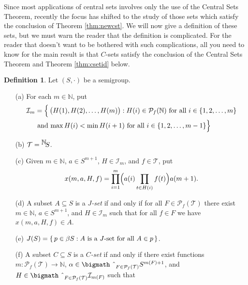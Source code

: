 \documentclass[12pt]{article}
\theoremstyle{plain}
\theoremstyle{definition}
\newtheorem{defn}[thm]{Definition}
\newcommand{\bbN}{\mathbb{N}}
\newcommand{\setfunc}[2]{\hbox{${}^{\hbox{$#1$}}\hskip -2 pt #2$}}
\newcommand{\bigtimes}{\hbox{\bigmath \char'2}}
\begin{document}
Since most applications of central sets involves only the use of the
Central Sets Theorem, recently the focus has shifted to the study of
those sets which satisfy the conclusion of Theorem \ref{thm:newcst}. 
We will now give a definition of these sets, but we must warn the
reader that the definition is complicated. 
For the reader that doesn't want to be bothered with such
complications, all you need to know for the main result is that $C$-sets satisfy the
conclusion of the Central Sets Theorem and Theorem \ref{thm:csetid}
below. 
   \begin{defn}
    Let $(S, \cdot)$ be a semigroup.
      \begin{itemize}
        \item[(a)] For each $m \in \bbN$, put 
          \begin{align*}
            \mathcal{I}_m &= \Bigl\{\, \bigl( H(1), H(2), \ldots, H(m)
            \bigr) : \hbox{$H(i) \in \mathcal{P}_f(\bbN)$ for all $i
              \in \{1, 2, \ldots, m\}$} \\
            &\hbox{ and $\max H(i) < \min H(i+1)$
            for all $i \in \{1, 2, \ldots, m-1\}$} \Bigr\}
         \end{align*}
        \item[(b)] $\mathcal{T} = \setfunc{\bbN}{S}$. 
        \item[(c)] Given $m \in \bbN$, $a \in S^{m+1}$, $H \in
          \mathcal{I}_m$, and $f \in \mathcal{T}$, put 
            \[
            x(m, a, H, f) = \prod_{i=1}^m\Bigl(a(i)\prod_{t \in H(i)}
            f(t) \Bigr)a(m+1).
            \]
        \item[(d)] A subset $A \subseteq S$ is a \textsl{$J$-set} if
          and only if for all $F \in \mathcal{P}_f(\mathcal{T})$ there
          exist $m \in \bbN$, $a \in S^{m+1}$, and $H \in \mathcal{I}_m$
          such that for all $f \in F$ we have $x(m,a,H,f) \in A$.
        \item[(e)] $J(S) = \{\, p \in \beta S : \hbox{$A$ is a $J$-set
            for all $A \in p$} \,\}$.
      
        \item[(f)] A subset $C \subseteq S$ is a \textsl{$C$-set} if
          and only if there exist functions $m :
          \mathcal{P}_f(\mathcal{T}) \to \bbN$, $\alpha \in
          \bigtimes_{F \in \mathcal{P}_f(\mathcal{T})} S^{m(F)+1}$,
          and $H \in \bigtimes_{F \in \mathcal{P}_f(\mathcal{T})}
          \mathcal{I}_{m(F)}$ such that


\end{itemize}
\end{defn}
\end{document}

